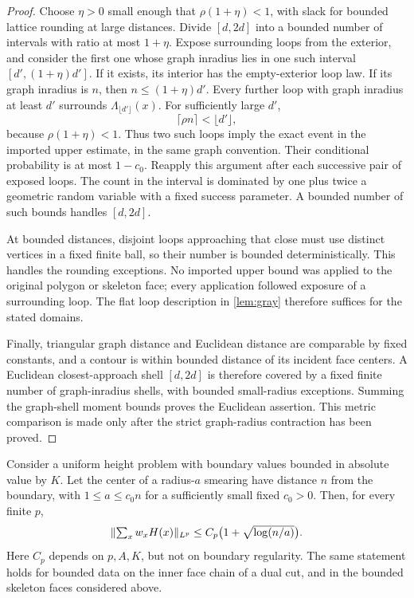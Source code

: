 \begin{proof}
Choose $\eta>0$ small enough that $\rho(1+\eta)<1$, with slack for bounded
lattice rounding at large distances.  Divide $[d,2d]$ into a bounded
number of intervals with ratio at most $1+\eta$.  Expose surrounding loops
from the exterior, and consider the first one whose graph inradius
lies in one such interval $[d', (1+\eta)d']$.  If it exists, its interior
has the empty-exterior loop law.  If its graph inradius is $n$, then
$n\le(1+\eta)d'$.  Every further loop with graph inradius at least $d'$
surrounds $\Lambda_{\lfloor d'\rfloor}(x)$.  For sufficiently large $d'$,
\[
 \lceil\rho n\rceil<\lfloor d'\rfloor,
\]
because $\rho(1+\eta)<1$.  Thus two such loops imply the exact event
in the imported upper estimate, in the same graph convention.  Their
conditional probability is at most $1-c_0$.
Reapply this argument after each successive pair of exposed loops.
The count in the interval is dominated by one plus twice a geometric
random variable with a fixed success parameter.  A bounded number of
such bounds handles $[d,2d]$.

At bounded distances, disjoint loops approaching that close must use
distinct vertices in a fixed finite ball, so their number is bounded
deterministically.  This handles the rounding exceptions.  No imported
upper bound was applied to the original polygon or skeleton face; every
application followed exposure of a surrounding loop.  The flat loop
description in \cref{lem:gray} therefore suffices for the stated domains.

Finally, triangular graph distance and Euclidean distance are comparable
by fixed constants, and a contour is within bounded distance of its
incident face centers.  A Euclidean closest-approach shell $[d,2d]$ is
therefore covered by a fixed finite number of graph-inradius shells,
with bounded small-radius exceptions.  Summing the graph-shell moment
bounds proves the Euclidean assertion.  This metric comparison is made
only after the strict graph-radius contraction has been proved.
\end{proof}

\begin{proposition}\label{prop:smearing-moments}
Consider a uniform height problem with boundary values bounded in absolute
value by $K$.  Let the center of a radius-$a$ smearing have distance $n$
from the boundary, with $1\leq a\leq c_0n$ for a sufficiently small fixed
$c_0>0$.  Then, for every finite $p$,
\begin{equation}\label{eq:smearing-moments}
 \lVert\textstyle\sum_xw_xH(x)\rVert_{L^p}
 \leq C_p\bigl(1+\sqrt{\log(n/a)}\bigr).
\end{equation}
Here $C_p$ depends on $p,A,K$, but not on boundary regularity.  The same
statement holds for bounded data on the inner face chain of a dual cut,
and in the bounded skeleton faces considered above.
\end{proposition}

